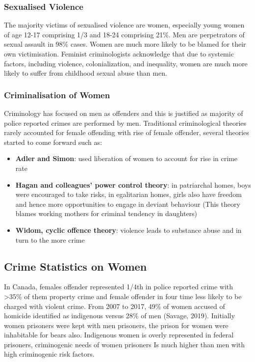 \documentclass{article}
\begin{document}
\subsubsection*{Sexualised Violence}

The majority victims of sexualised violence are women, especially young women of age 12-17 comprising 1/3 and 18-24 comprising 21\%. Men are perpetrators of sexual assault in 98\% cases. Women are much more likely to be blamed for their own victimisation. Feminist criminologists acknowledge that due to systemic factors, including violence, colonialization, and inequality, women are much more likely to suffer from childhood sexual abuse than men.

\subsubsection*{Criminalisation of Women}

Criminology has focused on men as offenders and this is justified as majority of police reported crimes are performed by men. Traditional criminological theories rarely accounted for female offending with rise of female offender, several theories started to come forward such as:

\begin{itemize}
    \item \textbf{Adler and Simon}: used liberation of women to account for rise in crime rate
    \item \textbf{Hagan and colleagues' power control theory}: in patriarchal homes, boys were encouraged to take risks, in egalitarian homes, girls also have freedom and hence more opportunities to engage in deviant behaviour (This theory blames working mothers for criminal tendency in daughters)
    \item \textbf{Widom, cyclic offence theory}: violence leads to substance abuse and in turn to the more crime
\end{itemize}

\subsection{Crime Statistics on Women}

In Canada, females offender represented 1/4th in police reported crime with >35\% of them property crime and female offender in four time less likely to be charged with violent crime. From 2007 to 2017, 49\% of women accused of homicide identified as indigenous versus 28\% of men (Savage, 2019). Initially women prisoners were kept with men prisoners, the prison for women were inhabitable for bears also. Indigenous women is overly represented in federal prisoners, criminogenic needs of women prisoners Is much higher than men with high criminogenic risk factors.
\end{document}
